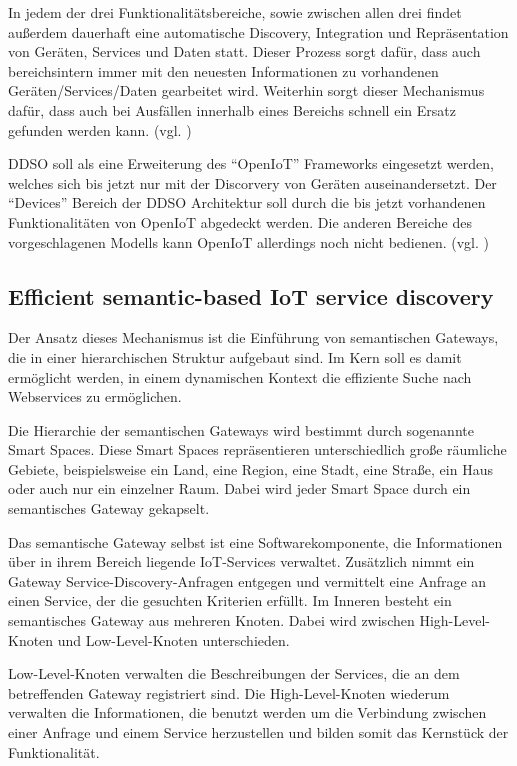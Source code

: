\documentclass[conference,compsoc]{IEEEtran}
\begin{document}
In jedem der drei Funktionalitätsbereiche, sowie zwischen allen drei findet außerdem dauerhaft eine automatische Discovery, Integration und Repräsentation von Geräten, Services und Daten statt. Dieser Prozess sorgt dafür, dass auch bereichsintern immer mit den neuesten Informationen zu vorhandenen Geräten/Services/Daten gearbeitet wird. Weiterhin sorgt dieser Mechanismus dafür, dass auch bei Ausfällen innerhalb eines Bereichs schnell ein Ersatz gefunden werden kann. (vgl. \cite{DDSO})

DDSO soll als eine Erweiterung des \enquote{OpenIoT} Frameworks eingesetzt werden, welches sich bis jetzt nur mit der Discorvery von Geräten auseinandersetzt. Der \enquote{Devices} Bereich der DDSO Architektur soll durch die bis jetzt vorhandenen Funktionalitäten von OpenIoT abgedeckt werden. Die anderen Bereiche des vorgeschlagenen Modells kann OpenIoT allerdings noch nicht bedienen. (vgl. \cite{DDSO})

\subsection{Efficient semantic-based IoT service discovery}

Der Ansatz dieses Mechanismus ist die Einführung von semantischen Gateways, die in einer hierarchischen Struktur aufgebaut sind. Im Kern soll es damit ermöglicht werden, in einem dynamischen Kontext die effiziente Suche nach Webservices zu ermöglichen.

Die Hierarchie der semantischen Gateways wird bestimmt durch sogenannte Smart Spaces. Diese Smart Spaces repräsentieren unterschiedlich große räumliche Gebiete, beispielsweise ein Land, eine Region, eine Stadt, eine Straße, ein Haus oder auch nur ein einzelner Raum. Dabei wird jeder Smart Space durch ein semantisches Gateway gekapselt.

Das semantische Gateway selbst ist eine Softwarekomponente, die Informationen über in ihrem Bereich liegende IoT-Services verwaltet. Zusätzlich nimmt ein Gateway Service-Discovery-Anfragen entgegen und vermittelt eine Anfrage an einen Service, der die gesuchten Kriterien erfüllt. Im Inneren besteht ein semantisches Gateway aus mehreren Knoten. Dabei wird zwischen High-Level-Knoten und Low-Level-Knoten unterschieden.

Low-Level-Knoten verwalten die Beschreibungen der Services, die an dem betreffenden Gateway registriert sind. Die High-Level-Knoten wiederum verwalten die Informationen, die benutzt werden um die Verbindung zwischen einer Anfrage und einem Service herzustellen und bilden somit das Kernstück der Funktionalität.
\end{document}
